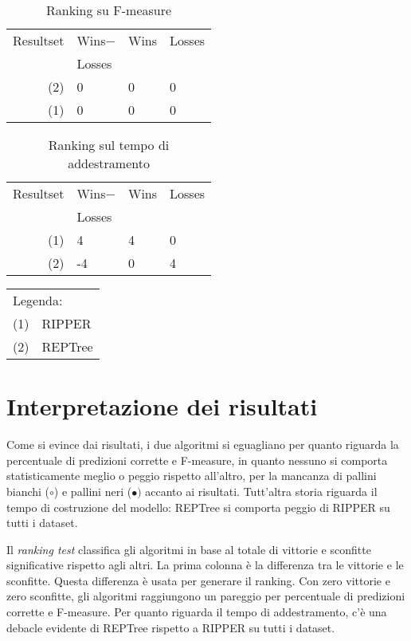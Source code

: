 \begin{table}[thb]
	\footnotesize
	{\centering \begin{tabular}{rlll}\\
			\hline
			Resultset & Wins$-$ & Wins & Losses \\
			& Losses & & \\
			\hline
			(2) &   0 &   0 &   0\\
			(1) &   0 &   0 &   0\\
			\hline
		\end{tabular} \footnotesize \par}
		\caption{\label{labelname}Ranking su F-measure}
\end{table}

\begin{table}[thb]
	\footnotesize
	{\centering \begin{tabular}{rlll}\\
			\hline
			Resultset & Wins$-$ & Wins & Losses \\
			& Losses & & \\
			\hline
			(1) &   4 &   4 &   0\\
			(2) &  -4 &   0 &   4\\
			\hline
		\end{tabular} \footnotesize \par}
		\caption{\label{labelname}Ranking sul tempo di addestramento}
\end{table}

\begin{table}[thb]
	\scriptsize
	{\centering
		\begin{tabular}{cl}\\
			\multicolumn{2}{l}{Legenda:} \\
			(1) & RIPPER \\
			(2) & REPTree \\
		\end{tabular}
	}
\end{table}

\clearpage

\section{Interpretazione dei risultati}

Come si evince dai risultati, i due algoritmi si eguagliano per quanto riguarda la percentuale di predizioni corrette e F-measure, in quanto nessuno si comporta statisticamente meglio o peggio rispetto all'altro, per la mancanza di pallini bianchi ($\circ$) e pallini neri ($\bullet)$ accanto ai risultati. Tutt'altra storia riguarda il tempo di costruzione del modello: REPTree si comporta peggio di RIPPER su tutti i dataset.

Il \emph{ranking test} classifica gli algoritmi in base al totale di vittorie e sconfitte significative rispetto agli altri. La prima colonna è la differenza tra le vittorie e le sconfitte. Questa differenza è usata per generare il ranking. Con zero vittorie e zero sconfitte, gli algoritmi raggiungono un pareggio per percentuale di predizioni corrette e F-measure. Per quanto riguarda il tempo di addestramento, c'è una debacle evidente di REPTree rispetto a RIPPER su tutti i dataset.

